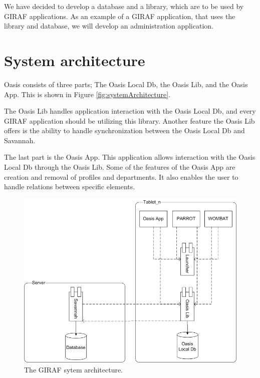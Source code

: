 We have decided to develop a database and a library, which are to be used by GIRAF applications.
As an example of a GIRAF application, that uses the library and database, we will develop an administration application.

\section{System architecture}
\label{sec:OasisSystemArchitecture}
Oasis consists of three parts; The Oasis Local Db, the Oasis Lib, and the Oasis App. This is shown in Figure \vref{fig:systemArchitecture}.

The Oasis Lib handles application interaction with the Oasis Local Db, and every GIRAF application should be utilizing this library.
Another feature the Oasis Lib offers is the ability to handle synchronization between the Oasis Local Db and Savannah.

The last part is the Oasis App.
This application allows interaction with the Oasis Local Db through the Oasis Lib. 
Some of the features of the Oasis App are creation and removal of profiles and departments.
It also enables the user to handle relations between specific elements.

\begin{figure}
	\centering
		\includegraphics[width=\textwidth]{Images/Giraf_comp_pic_fix}
	\caption{The GIRAF sytem architecture.}
	\label{fig:systemArchitecture}
\end{figure}